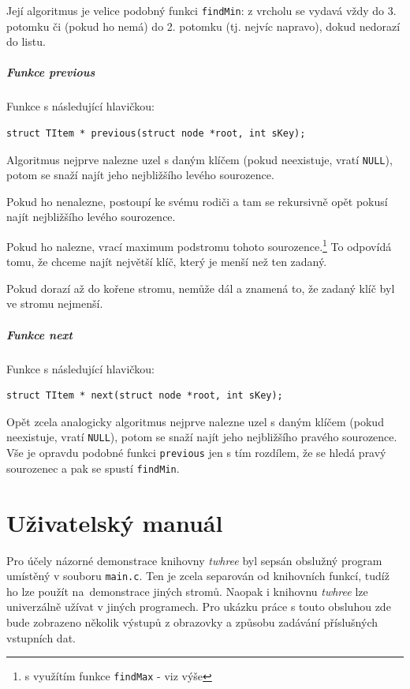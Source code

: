 \documentclass[11pt,a4paper]{article}
\begin{document}
Její algoritmus je velice podobný funkci \verb~findMin~: z vrcholu se vydavá
vždy do 3. potomku či (pokud ho nemá) do 2. potomku (tj. nejvíc napravo), dokud
nedorazí do listu.

\subsubsection{Funkce previous}

Funkce s následující hlavičkou:

\begin{verbatim}
struct TItem * previous(struct node *root, int sKey);
\end{verbatim}

Algoritmus nejprve nalezne uzel s daným klíčem (pokud neexistuje, vratí
\verb~NULL~), potom se snaží najít jeho nejbližšího levého sourozence.

Pokud ho nenalezne, postoupí ke svému rodiči  a tam se rekursivně
opět pokusí najít nejbližšího levého sourozence.

Pokud ho nalezne, vrací maximum podstromu tohoto sourozence.\footnote{s
využítím funkce \verb~findMax~ - viz výše} To odpovídá tomu, že chceme najít
největší klíč, který je menší než ten zadaný.

Pokud dorazí až do kořene stromu, nemůže dál a znamená to, že zadaný klíč byl
ve stromu nejmenší.

\subsubsection{Funkce next}

Funkce s následující hlavičkou:

\begin{verbatim}
struct TItem * next(struct node *root, int sKey);
\end{verbatim}

Opět zcela analogicky algoritmus nejprve nalezne uzel s daným klíčem (pokud
neexistuje, vratí \verb~NULL~), potom se snaží najít jeho nejbližšího pravého
sourozence.
Vše je opravdu podobné funkci \verb~previous~ jen s tím rozdílem, že se hledá
pravý sourozenec a pak se spustí \verb~findMin~.

\pagebreak

\part{Uživatelský manuál}
Pro účely názorné demonstrace knihovny \textit{twhree} byl sepsán obslužný
program umístěný v souboru \verb=main.c=.
Ten je zcela separován od knihovních funkcí, tudíž ho lze použít
na~demonstrace jiných stromů.
Naopak i knihovnu \textit{twhree} lze univerzálně užívat v jiných programech.
Pro ukázku práce s touto obsluhou zde bude zobrazeno několik výstupů z
obrazovky a způsobu zadávání příslušných vstupních dat.
\end{document}
